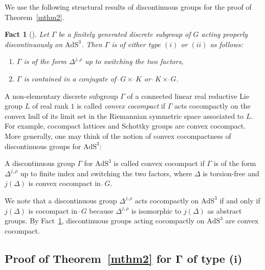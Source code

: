 \documentclass[pdftex]{sigma}
\numberwithin{equation}{section}
\newtheorem{Fact}[Theorem]{Fact}
 { \theoremstyle{definition}
\newtheorem{Definition}[Theorem]{Definition}
\newtheorem{Note}[Theorem]{Note}
\newtheorem{Example}[Theorem]{Example}
\newtheorem{Remark}[Theorem]{Remark}
\newtheorem{Setting}[Theorem]{Setting}
\newtheorem{Notation}[Theorem]{Notation}
}
\begin{document}
We use the following structural results of discontinuous groups
for the proof of Theorem~\ref{mthm2}.
\begin{Fact}[{\cite[Lemma~9.2]{KaKob16}}]
\label{explicit}
Let $\Gamma$ be a finitely generated discrete subgroup of $G$
acting properly discontinuously on $\mathrm{AdS}^{3}$.
Then $\Gamma$ is of either type $(i)$ or $(ii)$ as follows:
\begin{enumerate}\itemsep=0pt
\setlength{\leftskip}{1.1cm}
\item[type\phantom{$i$}~$(i)$]
$\Gamma$ is of the form $\Delta^{j,\rho}$ up to switching the two factors,
\item[type~$(ii)$]
$\Gamma$ is contained in a conjugate of
$\grave{\ }G \times\grave{\ }K$ or
$\grave{\ }K\times\grave{\ }G$.
\end{enumerate}
\end{Fact}

A non-elementary discrete subgroup $\Gamma$ of
a connected linear real reductive Lie group $L$ of real rank $1$
is called \textit{convex cocompact}
if $\Gamma$ acts cocompactly on the convex hull of
its limit set in the Riemannian symmetric space associated to $L$.
For example, cocompact lattices and Schottky groups are convex cocompact.
More generally, one may think of the notion of convex cocompactness of
discontinuous groups for $\mathrm{AdS}^{3}$:
\begin{Definition}
\label{convex_cocompact}
A discontinuous group $\Gamma$ for $\mathrm{AdS}^{3}$ is called convex cocom\-pact
if $\Gamma$ is of the form $\Delta^{j,\rho}$
up to finite index and switching the two factors,
where $\Delta$ is torsion-free and
$j(\Delta)$ is convex cocompact in $\grave{\ }G$.
\end{Definition}

We note that
a discontinuous group $\Delta^{j,\rho}$ acts cocompactly on $\mathrm{AdS}^{3}$
if and only if
$j(\Delta)$ is cocompact in $\grave{\ }G$
because $\Delta^{j,\rho}$ is isomorphic to $j(\Delta)$ as abstract groups.
By Fact~\ref{explicit}, discontinuous groups acting cocompactly on $\mathrm{AdS}^{3}$
are convex cocompact.

\subsection[Proof of Theorem~1.4 for Gamma of type (i)]
{Proof of Theorem~\ref{mthm2} for $\boldsymbol\Gamma$ of type ($\boldsymbol i$)}
\end{document}
